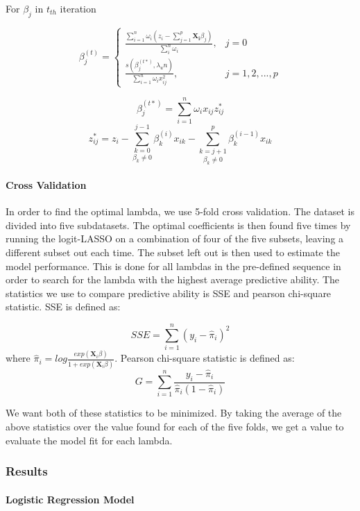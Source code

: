 \documentclass[]{article}
\let\oldparagraph\paragraph
\renewcommand{\paragraph}[1]{\oldparagraph{#1}\mbox{}}
\begin{document}
For \(\beta_j\) in \(t_{th}\) iteration

\[\beta_j^{(t)} = \left\{\begin{array}{lc} \frac{\sum_{i=1}^{n} \omega_i(z_i-\sum_{j=1}^{p}{\boldsymbol {X_i}\beta_j})}{\sum_{i}^{n}\omega_i},&j=0\\\frac{s(\beta_j^{(t*)},\lambda_un)}{\sum_{i=1}^{n}\omega_ix_{ij}^2},&j = 1,2,...,p\end{array}\right.\]

\[\beta_j^{(t*)} = \sum_{i=1}^{n}\omega_ix_{ij}z_{ij}^*\]
\[z_{ij}^* = z_i-\underset {\beta_k\neq0}{\sum_{k = 0}^{j-1}}\beta_k^{(i)}x_{ik}-\underset {\beta_k\neq0}{\sum_{k=j+1}^{p}}\beta_k^{(i-1)}x_{ik}\]

\hypertarget{cross-validation}{%
\paragraph{Cross Validation}\label{cross-validation}}

In order to find the optimal lambda, we use 5-fold cross validation. The
dataset is divided into five subdatasets. The optimal coefficients is
then found five times by running the logit-LASSO on a combination of
four of the five subsets, leaving a different subset out each time. The
subset left out is then used to estimate the model performance. This is
done for all lambdas in the pre-defined sequence in order to search for
the lambda with the highest average predictive ability. The statistics
we use to compare predictive ability is SSE and pearson chi-square
statistic. SSE is defined as:

\[SSE = \sum_{i=1}^{n}(y_i-{\widehat \pi_i})^2\] where
\({\widehat \pi_i} = log\frac{exp({\boldsymbol X_i\beta})}{1+exp({\boldsymbol X_i\beta})}\).
Pearson chi-square statistic is defined as:
\[G = \sum_{i=1}^{n}\frac{y_i-{\widehat \pi_i}}{{\widehat \pi_i}(1-{\widehat \pi_i})}\]

We want both of these statistics to be minimized. By taking the average
of the above statistics over the value found for each of the five folds,
we get a value to evaluate the model fit for each lambda.

\hypertarget{results}{%
\subsubsection{Results}\label{results}}

\hypertarget{logistic-regression-model}{%
\paragraph{Logistic Regression Model}\label{logistic-regression-model}}
\end{document}
